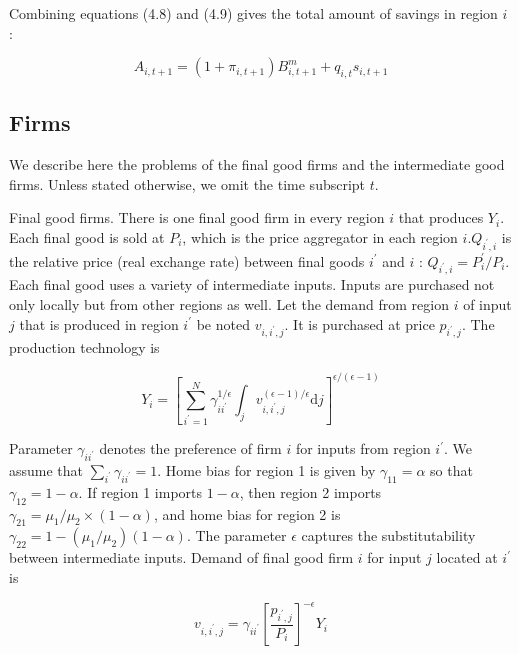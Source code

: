 \documentclass[\latexroot/\projectname]{subfiles}
\begin{document}
Combining equations (4.8) and (4.9) gives the total amount of savings in region $i$ :


\begin{equation*}
A_{i, t+1}=\left(1+\pi_{i, t+1}\right) B_{i, t+1}^{m}+q_{i, t} s_{i, t+1} \tag{4.10}
\end{equation*}


\subsection{Firms}
We describe here the problems of the final good firms and the intermediate good firms. Unless stated otherwise, we omit the time subscript $t$.

Final good firms. There is one final good firm in every region $i$ that produces $Y_{i}$. Each final good is sold at $P_{i}$, which is the price aggregator in each region $i . Q_{i^{\prime}, i}$ is the relative price (real exchange rate) between final goods $i^{\prime}$ and $i$ : $Q_{i^{\prime}, i}=P_{i}^{\prime} / P_{i}$. Each final good uses a variety of intermediate inputs. Inputs are purchased not only locally but from other regions as well. Let the demand from region $i$ of input $j$ that is produced in region $i^{\prime}$ be noted $v_{i, i^{\prime}, j}$. It is purchased at price $p_{i^{\prime}, j}$. The production technology is


\begin{equation*}
Y_{i}=\left[\sum_{i^{\prime}=1}^{N} \gamma_{i i^{\prime}}^{1 / \epsilon} \int_{j} v_{i, i^{\prime}, j}^{(\epsilon-1) / \epsilon} \mathrm{d} j\right]^{\epsilon /(\epsilon-1)} \tag{4.11}
\end{equation*}


Parameter $\gamma_{i i^{\prime}}$ denotes the preference of firm $i$ for inputs from region $i^{\prime}$. We assume that $\sum_{i^{\prime}} \gamma_{i i^{\prime}}=1$. Home bias for region 1 is given by $\gamma_{11}=\alpha$ so that $\gamma_{12}=1-\alpha$. If region 1 imports $1-\alpha$, then region 2 imports $\gamma_{21}=\mu_{1} / \mu_{2} \times(1-\alpha)$, and home bias for region 2 is $\gamma_{22}=1-\left(\mu_{1} / \mu_{2}\right)(1-\alpha)$. The parameter $\epsilon$ captures the substitutability between intermediate inputs. Demand of final good firm $i$ for input $j$ located at $i^{\prime}$ is


\begin{equation*}
v_{i, i^{\prime}, j}=\gamma_{i i^{\prime}}\left[\frac{p_{i^{\prime}, j}}{P_{i}}\right]^{-\epsilon} Y_{i} \tag{4.12}
\end{equation*}
\end{document}
